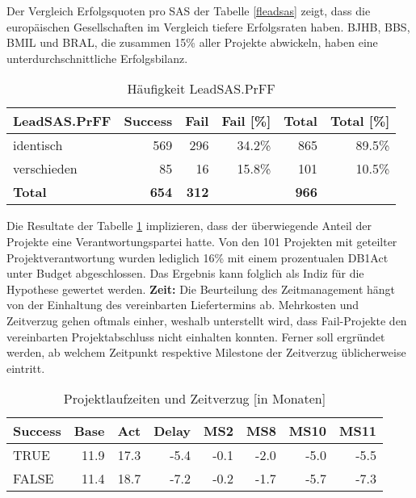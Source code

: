 Der Vergleich Erfolgsquoten pro SAS der Tabelle \ref{fleadsas} zeigt, dass die europäischen Gesellschaften im Vergleich tiefere Erfolgsraten haben. BJHB, BBS, BMIL und BRAL, die zusammen 15\% aller Projekte abwickeln, haben eine unterdurchschnittliche Erfolgsbilanz.
\begin{table}[H]
	\centering
	\caption{Häufigkeit LeadSAS.PrFF}
	\begin{tabular}{lrrrrr}
		\textbf{LeadSAS.PrFF} & \multicolumn{1}{l}{\textbf{Success}} & \multicolumn{1}{l}{\textbf{Fail}} & \multicolumn{1}{l}{\textbf{Fail [\%]}} & \multicolumn{1}{l}{\textbf{Total}} & \multicolumn{1}{l}{\textbf{Total [\%]}}
		\\\hline
		identisch    & 569   & 296   & 34.2\% & 865 & 89.5\% \\
		verschieden   & 85    & 16    & 15.8\% & 101 & 10.5\% \\\hline
		\textbf{Total} & \textbf{654} & \textbf{312} &       & \textbf{966} \\
	\end{tabular}%
	\label{fleadsasprff}%
\end{table}%
Die Resultate der Tabelle \ref{fleadsasprff} implizieren, dass der überwiegende Anteil der Projekte eine Verantwortungspartei hatte. Von den 101 Projekten mit geteilter Projektverantwortung wurden lediglich 16\% mit einem prozentualen DB1Act unter Budget abgeschlossen. Das Ergebnis kann folglich als Indiz für die Hypothese gewertet werden.
\newline\newline\textbf{Zeit:} Die Beurteilung des Zeitmanagement hängt von der Einhaltung des vereinbarten Liefertermins ab. Mehrkosten und Zeitverzug gehen oftmals einher, weshalb unterstellt wird, dass Fail-Projekte den vereinbarten Projektabschluss nicht einhalten konnten. Ferner soll ergründet werden, ab welchem Zeitpunkt respektive Milestone der Zeitverzug üblicherweise eintritt. 
\begin{table}[H]
	\centering
	\caption{Projektlaufzeiten und Zeitverzug [in Monaten]}
	\begin{tabular}{lrrrrrrr}
		\textbf{Success} & \multicolumn{1}{l}{\textbf{Base}} & \multicolumn{1}{l}{\textbf{Act}} & \multicolumn{1}{l}{\textbf{Delay}} & \multicolumn{1}{l}{\textbf{MS2}} & \multicolumn{1}{l}{\textbf{MS8}} & \multicolumn{1}{l}{\textbf{MS10}} & \multicolumn{1}{l}{\textbf{MS11}} \\ \hline
		TRUE  & 11.9  & 17.3  & -5.4  & -0.1  & -2.0  & -5.0  & -5.5 \\
		FALSE & 11.4  & 18.7  & -7.2  & -0.2  & -1.7  & -5.7  & -7.3 \\
	\end{tabular}%
	\label{mtime}%
\end{table}%
